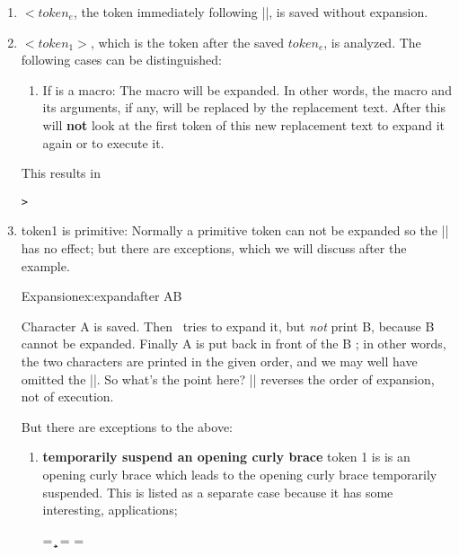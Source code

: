\begin{enumerate}
\item  $<token_e$, the token immediately following |\expandafter|, is saved without expansion.
\item $<token_1>$, which is the token after the saved $token_e$, is analyzed. The following cases can be distinguished:
\begin{enumerate}
\item If is a macro: The macro will be expanded. In other words, the macro and its arguments, if any, will be replaced by the replacement text. After this \tex will \textbf{not} look at the first token of this new replacement text to expand it again or to execute it.
\end{enumerate}



\begin{teX}
\def\xx [#1]{[#1]}
\def\yy{[ABC]}

\expandafter\xx\yy
\end{teX}

This results in 
\def\xx [#1]{[#1]}
\def\yy{[ABC]}

\texttt{> \expandafter\xx\yy}


\item token1 is primitive: Normally a primitive token can not be expanded so the |\expandafter| has no effect; but there are exceptions, which we will discuss after the example.

\begin{texexample}{Expansion}{ex:expandafter}
\expandafter AB
\end{texexample}

Character A is saved. Then \tex\ tries to expand it, but \textit{not} print B, because B cannot be expanded. Finally A is put back in front of the B ; in other words, the two characters are printed in the given order, and we may well have omitted the |\expandafter|. So what's the point here? |\expandafter| reverses the order of expansion, not of execution.

\noindent But there are exceptions to the above:
\begin{enumerate}
\item \textbf{temporarily suspend an opening curly brace} token 1 is is an opening curly brace which leads to the opening curly brace temporarily suspended. This is listed as a separate case because it has some interesting, applications;

\begin{teX}
\newtoks\ta
\newtoks\tb
\ta = {\a\b\c}
\tb=\expandafter{\the\ta}
\tb={\the\ta}
\tb
\end{teX}


\end{enumerate}
\end{enumerate}
